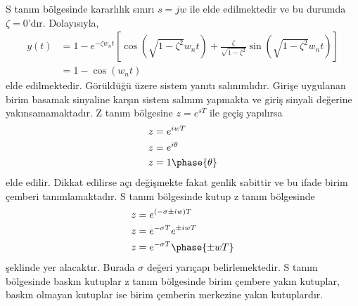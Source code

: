S tanım bölgesinde kararlılık sınırı $s=jw$ ile elde edilmektedir ve bu durumda $\zeta=0$'dır. Dolayısıyla,
\begin{equation}
\begin{split}
    y(t)&=1-e^{-\zeta w_nt}\left[\cos(\sqrt{1-\zeta^2}w_nt)+\frac{\zeta}{\sqrt{1-\zeta^2}}\sin(\sqrt{1-\zeta^2}w_nt)\right]\\
    &=1-\cos(w_nt)
\end{split}
\end{equation}
elde edilmektedir. Görüldüğü üzere sistem yanıtı salınımlıdır. Girişe uygulanan birim basamak sinyaline karşın sistem salınım yapmakta ve giriş sinyali değerine yakınsamamaktadır. Z tanım bölgesine $z=e^{sT}$ ile geçiş yapılırsa
\begin{equation}
    \begin{split}
        z&=e^{iwT}\\
        z&=e^{i\theta}\\
        z&=1\phase{ \theta}
    \end{split}
\end{equation}
elde edilir. Dikkat edilirse açı değişmekte fakat genlik sabittir ve bu ifade birim çemberi tanımlamaktadır. S tanım bölgesinde kutup z tanım bölgesinde 
\begin{equation}
    \begin{split}
        z&=e^{(-\sigma\pm iw) T}\\
        z&=e^{-\sigma T}e^{\pm iwT}\\
        z&=e^{-\sigma T}\phase{\pm wT}
    \end{split}
\end{equation}
şeklinde yer alacaktır. Burada $\sigma$ değeri yarıçapı belirlemektedir. S tanım bölgesinde baskın kutuplar z tanım bölgesinde birim çembere yakın kutuplar, baskın olmayan kutuplar ise birim çemberin merkezine yakın kutuplardır.

